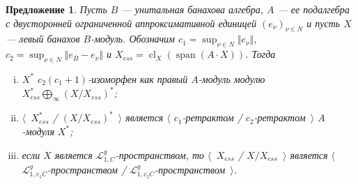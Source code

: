 \documentclass[12pt]{article}
\newtheorem{proposition}[theorem]{Предложение}
\begin{document}
\begin{proposition}\label{DualBanModDecomp} Пусть $B$ --- унитальная банахова алгебра, $A$ --- ее подалгебра с двусторонней ограниченной аппроксимативной единицей $(e_\nu)_{\nu\in N}$ и пусть $X$ --- левый банахов $B$-модуль. Обозначим $c_1=\sup_{\nu\in N}\Vert e_\nu\Vert$, $c_2=\sup_{\nu\in N}\Vert e_B-e_\nu\Vert$ и $X_{ess}=\operatorname{cl}_X(\operatorname{span}(A\cdot X))$. Тогда 
\begin{enumerate}[i)]
\item $X^*$ $c_2(c_1+1)$-изоморфен как правый $A$-модуль модулю $X_{ess}^*\bigoplus_\infty (X/X_{ess})^*$;
\item $\langle$~$X_{ess}^*$ / $(X/X_{ess})^*$~$\rangle$ является $\langle$ $c_1$-ретрактом / $c_2$-ретрактом~$\rangle$ $A$-модуля $X^*$;
\item если $X$ является $\mathcal{L}_{1,C}^g$-пространством, то $\langle$~$X_{ess}$ / $X/X_{ess}$~$\rangle$ является $\langle$~$\mathcal{L}_{1,c_1C}^g$-пространством / $\mathcal{L}_{1,c_2C}^g$-пространством~$\rangle$.
\end{enumerate}
\end{proposition}
\end{document}
